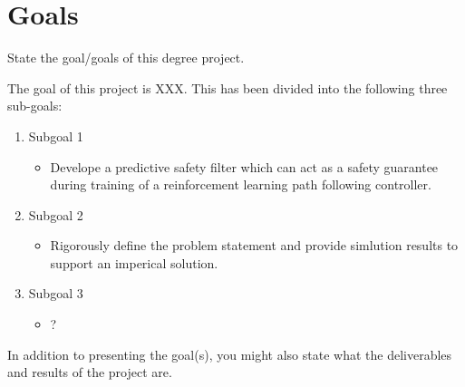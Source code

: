 \documentclass[english]{kththesis}
\begin{document}
\section{Goals}



State the goal/goals of this degree project.

The goal of this project is XXX. This has been divided into the following three sub-goals:
\begin{enumerate}
\item Subgoal 1 
    \begin{itemize}
        \item Develope a predictive safety filter which can act as a safety
            guarantee during training of a reinforcement learning path following
            controller.
    \end{itemize}
    \item Subgoal 2
    \begin{itemize}
        \item Rigorously define the problem statement and provide simlution results
            to support an imperical solution.
    \end{itemize}
\item Subgoal 3
    \begin{itemize}
        \item ?
    \end{itemize}
\end{enumerate}

In addition to presenting the goal(s), you might also state what the deliverables and results of the project are. 
\end{document}
